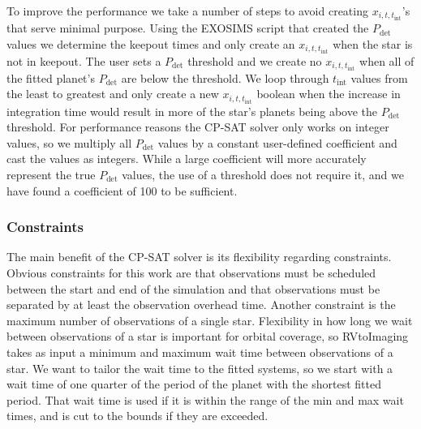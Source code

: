To improve the performance we take a number of steps to avoid creating $x_{i,
t, t_{\textrm{int}}}$'s that serve minimal purpose. Using the EXOSIMS script
that created the $P_{\textrm{det}}$ values we determine the keepout times and
only create an $x_{i, t, t_{\textrm{int}}}$ when the star is not in keepout.
The user sets a $P_{\textrm{det}}$ threshold and we create no $x_{i, t,
t_{\textrm{int}}}$ when all of the fitted planet's $P_{\textrm{det}}$ are below
the threshold. We loop through $t_{\textrm{int}}$ values from the least
to greatest and only create a new $x_{i, t, t_{\textrm{int}}}$ boolean when the
increase in integration time would result in more of the star's planets being above
the $P_{\textrm{det}}$ threshold. For performance reasons the CP-SAT solver
only works on integer values, so we multiply all $P_{\textrm{det}}$ values by a
constant user-defined coefficient and cast the values as integers. While a
large coefficient will more accurately represent the true $P_{\textrm{det}}$
values, the use of a threshold does not require it, and we have found a
coefficient of 100 to be sufficient.

\subsubsection{Constraints}

The main benefit of the CP-SAT solver is its flexibility regarding constraints.
Obvious constraints for this work are that observations must be scheduled
between the start and end of the simulation and that observations must be
separated by at least the observation overhead time. Another constraint is the
maximum number of observations of a single star. Flexibility in how long we
wait between observations of a star is important for orbital coverage, so
RVtoImaging takes as input a minimum and maximum wait time between observations
of a star. We want to tailor the wait time to the fitted systems, so we start
with a wait time of one quarter of the period of the planet with the shortest
fitted period. That wait time is used if it is within the range of the min and
max wait times, and is cut to the bounds if they are exceeded.

